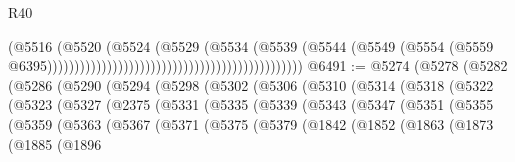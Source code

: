 \begin{lexlean}{R40}
\begin{coremodule}
                                                                              (@5516
                                                                                (@5520
                                                                                  (@5524
                                                                                    (@5529
                                                                                      (@5534
                                                                                        (@5539
                                                                                          (@5544
                                                                                            (@5549
                                                                                              (@5554
                                                                                                (@5559
                                                                                                  @6395)))))))))))))))))))))))))))))))))))))))))))))))
@6491 := @5274
    (@5278
      (@5282
        (@5286
          (@5290
            (@5294
              (@5298
                (@5302
                  (@5306
                    (@5310
                      (@5314
                        (@5318
                          (@5322
                            (@5323
                              (@5327
                                (@2375
                                  (@5331
                                    (@5335
                                      (@5339
                                        (@5343
                                          (@5347
                                            (@5351
                                              (@5355
                                                (@5359
                                                  (@5363
                                                    (@5367
                                                      (@5371
                                                        (@5375
                                                          (@5379
                                                            (@1842
                                                              (@1852
                                                                (@1863
                                                                  (@1873
                                                                    (@1885
                                                                      (@1896

\end{coremodule}
\end{lexlean}
